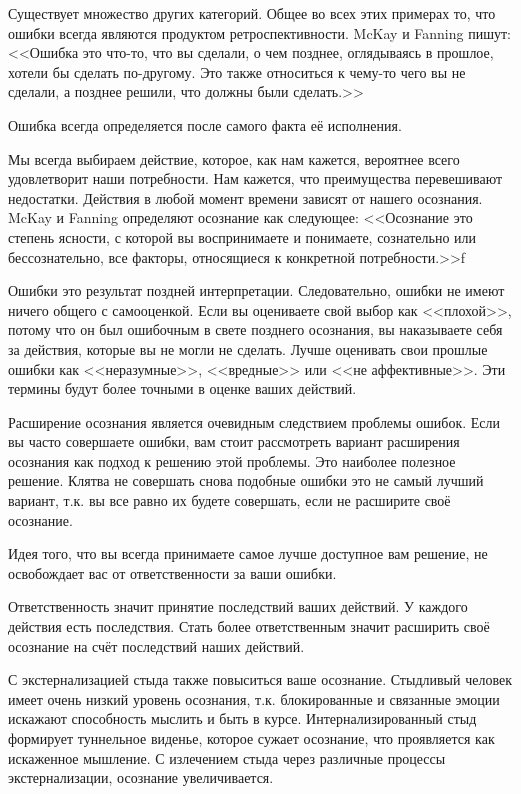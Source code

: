 \documentclass[10pt, fleqn]{article}
\begin{document}
Существует множество других категорий. Общее во всех этих примерах то, что ошибки всегда являются продуктом ретроспективности. McKay и Fanning пишут:
<<Ошибка это что-то, что вы сделали, о чем позднее, оглядываясь в прошлое, хотели бы сделать по-другому. Это также относиться к чему-то чего вы не сделали, а позднее решили, что должны были сделать.>>

Ошибка всегда определяется после самого факта её исполнения.

Мы всегда выбираем действие, которое, как нам кажется, вероятнее всего удовлетворит наши потребности. Нам кажется, что преимущества перевешивают недостатки. Действия в любой момент времени зависят от нашего осознания. McKay и Fanning определяют осознание как следующее:
<<Осознание это степень ясности, с которой вы воспринимаете и понимаете, сознательно или бессознательно, все факторы, относящиеся к конкретной потребности.>>f

Ошибки это результат поздней интерпретации. Следовательно, ошибки не имеют ничего общего с самооценкой. Если вы оцениваете свой выбор как <<плохой>>, потому что он был ошибочным в свете позднего осознания, вы наказываете себя за действия, которые вы не могли не сделать. Лучше оценивать свои прошлые ошибки как <<неразумные>>, <<вредные>> или <<не аффективные>>. Эти термины будут более точными в оценке ваших действий.

Расширение осознания является очевидным следствием проблемы ошибок. Если вы часто совершаете ошибки, вам стоит рассмотреть вариант расширения осознания как подход к решению этой проблемы. Это наиболее полезное решение. Клятва не совершать снова подобные ошибки это не самый лучший вариант, т.к. вы все равно их будете совершать, если не расширите своё осознание.

Идея того, что вы всегда принимаете самое лучше доступное вам решение, не освобождает вас от ответственности за ваши ошибки.


Ответственность значит принятие последствий ваших действий. У каждого действия есть последствия. Стать более ответственным значит расширить своё осознание на счёт последствий наших действий.


С экстернализацией стыда также повыситься ваше осознание. Стыдливый человек имеет очень низкий уровень осознания, т.к. блокированные и связанные эмоции искажают способность мыслить и быть в курсе. Интернализированный стыд формирует туннельное виденье, которое сужает осознание, что проявляется как искаженное мышление. С излечением стыда через различные процессы экстернализации, осознание увеличивается.
\end{document}

